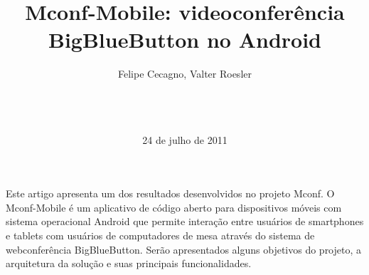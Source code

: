 \documentclass{acm_proc_article-sp}
\begin{document}
\title{Mconf-Mobile: videoconferência \\BigBlueButton no Android}
%
%
%
%
%

%
\author{
%
%
Felipe Cecagno,
Valter Roesler\\
       \\
       \\
       \\
}
\date{24 de julho de 2011}

\maketitle
\begin{resumo}
  Este artigo apresenta um dos resultados desenvolvidos no projeto Mconf. O Mconf-Mobile é um aplicativo de código aberto para dispositivos móveis com sistema operacional Android que permite interação entre usuários de smartphones e tablets com usuários de computadores de mesa através do sistema de webconferência BigBlueButton. Serão apresentados alguns objetivos do projeto, a arquitetura da solução e suas principais funcionalidades.
\end{resumo}
\end{document}
